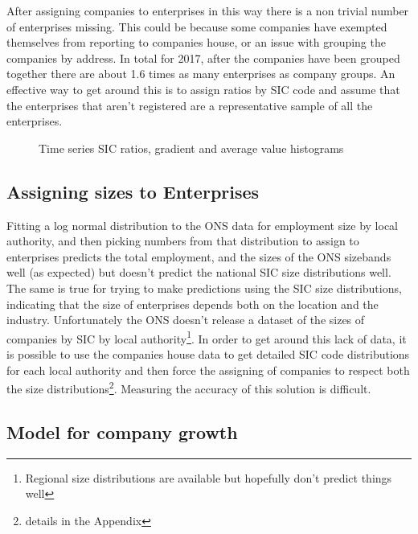 \documentclass[a4paper,10pt]{article}
\begin{document}
After assigning companies to enterprises in this way there is a non trivial number of enterprises missing. This could be because some companies have exempted themselves from reporting to companies house, or an issue with grouping the companies by address. In total for 2017, after the companies have been grouped together there are about 1.6 times as many enterprises as company groups. An effective way to get around this is to assign ratios by SIC code and assume that the enterprises that aren't registered are a representative sample of all the enterprises.
\begin{figure}
 \caption{Time series SIC ratios, gradient and average value histograms}
\end{figure}


\subsection{Assigning sizes to Enterprises}
\label{enterprise_sizes}
Fitting a log normal distribution to the ONS data for employment size by local authority, and then picking numbers from that distribution to assign to enterprises predicts the total employment, and the sizes of the ONS sizebands well (as expected) but doesn't predict the national SIC size distributions well. The same is true for trying to make predictions using the SIC size distributions, indicating that the size of enterprises depends both on the location and the industry. Unfortunately the ONS doesn't release a dataset of the sizes of companies by SIC by local authority\footnote{Regional size distributions are available but hopefully don't predict things well}. In order to get around this lack of data, it is possible to use the companies house data to get detailed SIC code distributions for each local authority and then force the assigning of companies to respect both the size distributions\footnote{details in the Appendix}. Measuring the accuracy of this solution is difficult.
\subsection{Model for company growth}
\end{document}
